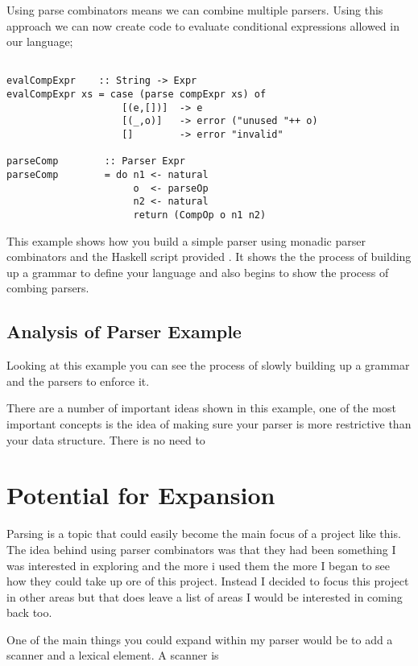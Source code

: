 Using parse combinators means we can combine multiple parsers. Using this approach we can now create code to evaluate conditional expressions allowed in our language;

\begin{lstlisting}

evalCompExpr    :: String -> Expr
evalCompExpr xs = case (parse compExpr xs) of
                    [(e,[])]  -> e
                    [(_,o)]   -> error ("unused "++ o)
                    []        -> error "invalid"

parseComp        :: Parser Expr	
parseComp        = do n1 <- natural
                      o  <- parseOp 
                      n2 <- natural
                      return (CompOp o n1 n2)  
\end{lstlisting}

This example shows how you build a simple parser using monadic parser combinators and the Haskell script provided %
. It shows the the process of building up a grammar to define your language and also begins to show the process of combing parsers. 


\subsection{Analysis of Parser Example}

Looking at this example you can see the process of slowly building up a grammar and the parsers to enforce it.

There are a number of important ideas shown in this example, one of the most important concepts is the idea of making sure your parser is more restrictive than your data structure. There is no need to  

\section{Potential for Expansion}

Parsing is a topic that could easily become the main focus of a project like this. The idea behind using parser combinators was that they had been something I was interested in exploring and the more i used them the more I began to see how they could take up ore of this project. Instead I decided to focus this project in other areas but that does leave a list of areas I would be interested in coming back too. 

One of the main things you could expand within my parser would be to add a scanner and a lexical element. A scanner is
 